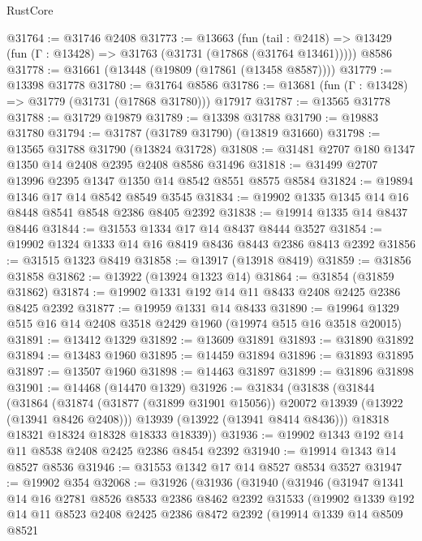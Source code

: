 \begin{lexlean}{RustCore}
\begin{coremodule}
@31764 := @31746 @2408
@31773 := @13663
    (fun (tail : @2418) => @13429 (fun (Γ : @13428) => @31763 (@31731 (@17868 (@31764 @13461)))))
    @8586
@31778 := @31661 (@13448 (@19809 (@17861 (@13458 @8587))))
@31779 := @13398 @31778
@31780 := @31764 @8586
@31786 := @13681 (fun (Γ : @13428) => @31779 (@31731 (@17868 @31780))) @17917
@31787 := @13565 @31778
@31788 := @31729 @19879
@31789 := @13398 @31788
@31790 := @19883 @31780
@31794 := @31787 (@31789 @31790) (@13819 @31660)
@31798 := @13565 @31788 @31790 (@13824 @31728)
@31808 := @31481 @2707 @180 @1347 @1350 @14 @2408 @2395 @2408 @8586 @31496
@31818 := @31499 @2707 @13996 @2395 @1347 @1350 @14 @8542 @8551 @8575 @8584
@31824 := @19894 @1346 @17 @14 @8542 @8549 @3545
@31834 := @19902 @1335 @1345 @14 @16 @8448 @8541 @8548 @2386 @8405 @2392
@31838 := @19914 @1335 @14 @8437 @8446
@31844 := @31553 @1334 @17 @14 @8437 @8444 @3527
@31854 := @19902 @1324 @1333 @14 @16 @8419 @8436 @8443 @2386 @8413 @2392
@31856 := @31515 @1323 @8419
@31858 := @13917 (@13918 @8419)
@31859 := @31856 @31858
@31862 := @13922 (@13924 @1323 @14)
@31864 := @31854 (@31859 @31862)
@31874 := @19902 @1331 @192 @14 @11 @8433 @2408 @2425 @2386 @8425 @2392
@31877 := @19959 @1331 @14 @8433
@31890 := @19964 @1329 @515 @16 @14 @2408 @3518 @2429 @1960 (@19974 @515 @16 @3518 @20015)
@31891 := @13412 @1329
@31892 := @13609 @31891
@31893 := @31890 @31892
@31894 := @13483 @1960
@31895 := @14459 @31894
@31896 := @31893 @31895
@31897 := @13507 @1960
@31898 := @14463 @31897
@31899 := @31896 @31898
@31901 := @14468 (@14470 @1329)
@31926 := @31834
    (@31838
      (@31844
        (@31864
          (@31874 (@31877 (@31899 @31901 @15056)) @20072 @13939 (@13922 (@13941 @8426 @2408)))
          @13939
          (@13922 (@13941 @8414 @8436)))
        @18318
        @18321
        @18324
        @18328
        @18333
        @18339))
@31936 := @19902 @1343 @192 @14 @11 @8538 @2408 @2425 @2386 @8454 @2392
@31940 := @19914 @1343 @14 @8527 @8536
@31946 := @31553 @1342 @17 @14 @8527 @8534 @3527
@31947 := @19902 @354
@32068 := @31926
    (@31936
      (@31940
        (@31946
          (@31947
            @1341
            @14
            @16
            @2781
            @8526
            @8533
            @2386
            @8462
            @2392
            @31533
            (@19902
              @1339
              @192
              @14
              @11
              @8523
              @2408
              @2425
              @2386
              @8472
              @2392
              (@19914
                @1339
                @14
                @8509
                @8521

\end{coremodule}
\end{lexlean}
